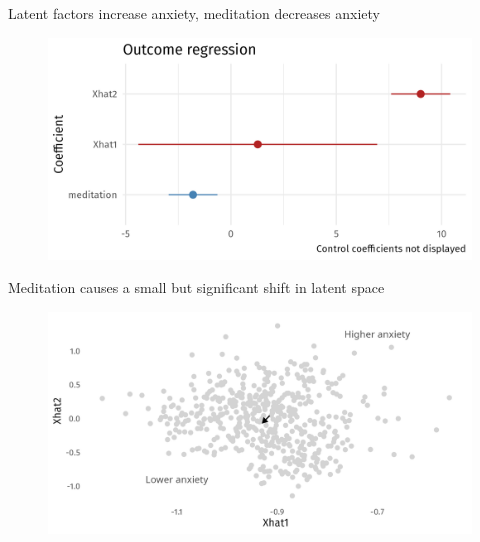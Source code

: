 \documentclass[aspectratio=169]{beamer}
\theoremstyle{remark}
\begin{document}
\begin{frame}{Latent factors increase anxiety, meditation decreases anxiety}
    \centering
    \begin{figure}
        \includegraphics[width=\textwidth]{figures/outcome-coefficients.png}
    \end{figure}
\end{frame}

\begin{frame}{Meditation causes a small but significant shift in latent space}
    \centering
    \begin{figure}
        \includegraphics{figures/latent-intervention.png}
    \end{figure}
\end{frame}
\end{document}
